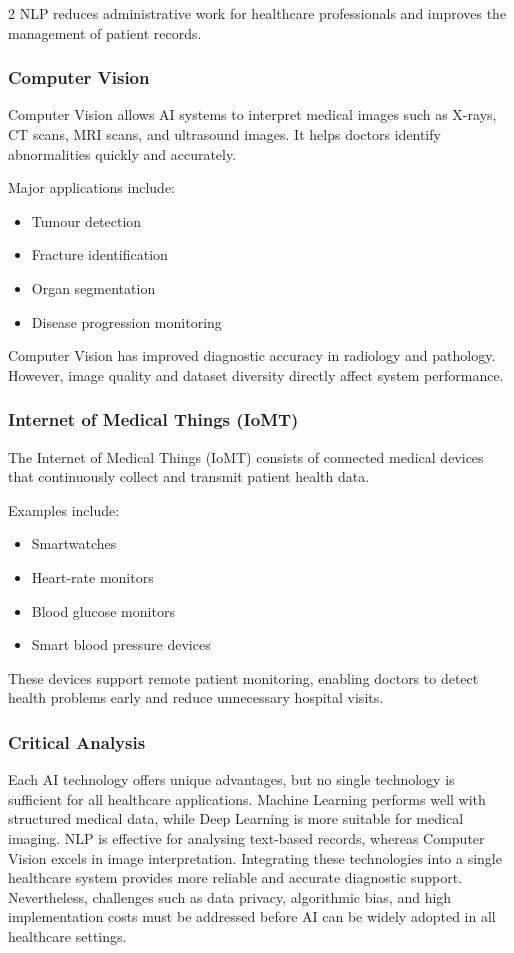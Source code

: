 \begin{multicols}{2}
  NLP reduces administrative work for healthcare professionals and improves the management of patient records.

  \subsubsection*{Computer Vision}
  Computer Vision allows AI systems to interpret medical images such as X-rays, CT scans, MRI scans, and ultrasound images. It helps doctors identify abnormalities quickly and accurately.

  \noindent
  Major applications include:
  \begin{itemize}
    \item Tumour detection
    \item Fracture identification
    \item Organ segmentation
    \item Disease progression monitoring
  \end{itemize}

  Computer Vision has improved diagnostic accuracy in radiology and pathology. However, image quality and dataset diversity directly affect system performance.

  \subsubsection*{Internet of Medical Things (IoMT)}
  The Internet of Medical Things (IoMT) consists of connected medical devices that continuously collect and transmit patient health data.

  \noindent
  Examples include:
  \begin{itemize}
    \item Smartwatches
    \item Heart-rate monitors
    \item Blood glucose monitors
    \item Smart blood pressure devices
  \end{itemize}

  These devices support remote patient monitoring, enabling doctors to detect health problems early and reduce unnecessary hospital visits.

  \subsubsection*{Critical Analysis}
  Each AI technology offers unique advantages, but no single technology is sufficient for all healthcare applications. Machine Learning performs well with structured medical data, while Deep Learning is more suitable for medical imaging. NLP is effective for analysing text-based records, whereas Computer Vision excels in image interpretation. Integrating these technologies into a single healthcare system provides more reliable and accurate diagnostic support. Nevertheless, challenges such as data privacy, algorithmic bias, and high implementation costs must be addressed before AI can be widely adopted in all healthcare settings.


\end{multicols}
